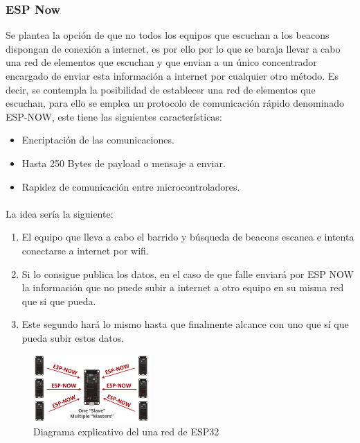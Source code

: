 \documentclass[a4paper ,12pt, onecolumn]{article}
\begin{document}
\begin{enumerate}
        \subsubsection {ESP Now}
            Se plantea la opción de que no todos los equipos que escuchan a los beacons dispongan de conexión a internet, es por ello
            por lo que se baraja llevar a cabo una red de elementos que escuchan y que envian a un único concentrador encargado de enviar
            esta información a internet por cualquier otro método.
            Es decir, se contempla la posibilidad de establecer una red de elementos que escuchan, para ello se emplea 
            un protocolo de comunicación rápido denominado ESP-NOW, este tiene las siguientes características:
            \begin{itemize}
                \item Encriptación de las comunicaciones.
                \item Hasta 250 Bytes de payload o mensaje a enviar.
                \item Rapidez de comunicación entre microcontroladores.
            \end{itemize}
            \paragraph{}
            La idea sería la siguiente:
            \begin{enumerate}
                \item El equipo que lleva a cabo el barrido y búsqueda de beacons escanea e intenta conectarse a 
                internet por wifi.
                \item Si lo consigue publica los datos, en el caso de que falle enviará por ESP NOW la información
                que no puede subir a internet a otro equipo en su misma red que si que pueda.
                \item Este segundo hará lo mismo hasta que finalmente alcance con uno que sí que pueda subir estos datos.
            \end{enumerate}
            \begin{center}
                \begin{figure}[ht]
                    \centering
                    \includegraphics[width=0.4\textwidth]{espnow.PNG}
                    \caption{Diagrama explicativo del una red de ESP32}
                    \label{fig:mesh4}
                \end{figure}
            \end{center}
        \end{enumerate}
\end{document}

